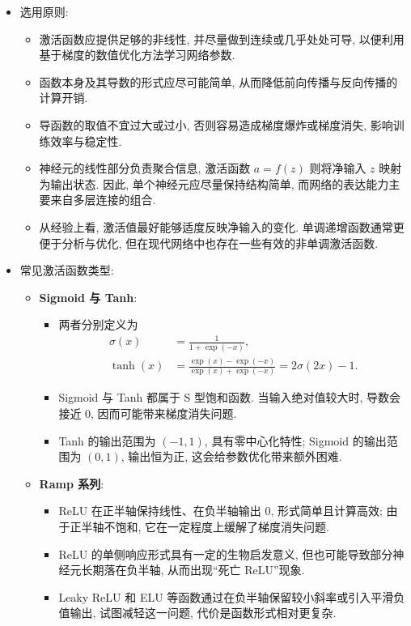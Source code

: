 \documentclass{../nndlcourse}
\begin{document}
\begin{itemize}
    \item 选用原则: 
    \begin{itemize}
        \item 激活函数应提供足够的非线性, 并尽量做到连续或几乎处处可导, 以便利用基于梯度的数值优化方法学习网络参数. 
        \item 函数本身及其导数的形式应尽可能简单, 从而降低前向传播与反向传播的计算开销. 
        \item 导函数的取值不宜过大或过小, 否则容易造成梯度爆炸或梯度消失, 影响训练效率与稳定性. 
        \item 神经元的线性部分负责聚合信息, 激活函数 $a = f(z)$ 则将净输入 $z$ 映射为输出状态. 因此, 单个神经元应尽量保持结构简单, 而网络的表达能力主要来自多层连接的组合. 
        \item 从经验上看, 激活值最好能够适度反映净输入的变化. 单调递增函数通常更便于分析与优化, 但在现代网络中也存在一些有效的非单调激活函数. 
    \end{itemize}
    \item 常见激活函数类型:
    \begin{itemize}
        \item \textbf{Sigmoid 与 Tanh}: 
        \begin{itemize}
            \item 两者分别定义为
            \begin{align*}
                \sigma(x) &= \frac{1}{1 + \exp(-x)}, \\
                \tanh(x) &= \frac{\exp(x) - \exp(-x)}{\exp(x) + \exp(-x)} = 2\sigma(2x) - 1.
            \end{align*}
            \item Sigmoid 与 Tanh 都属于 S 型饱和函数. 当输入绝对值较大时, 导数会接近 0, 因而可能带来梯度消失问题. 
            \item Tanh 的输出范围为 $(-1, 1)$, 具有零中心化特性; Sigmoid 的输出范围为 $(0, 1)$, 输出恒为正, 这会给参数优化带来额外困难. 
        \end{itemize}
        \item \textbf{Ramp 系列}: 
        \begin{itemize}
            \item ReLU 在正半轴保持线性、在负半轴输出 0, 形式简单且计算高效; 由于正半轴不饱和, 它在一定程度上缓解了梯度消失问题. 
            \item ReLU 的单侧响应形式具有一定的生物启发意义, 但也可能导致部分神经元长期落在负半轴, 从而出现“死亡 ReLU”现象. 
            \item Leaky ReLU 和 ELU 等函数通过在负半轴保留较小斜率或引入平滑负值输出, 试图减轻这一问题, 代价是函数形式相对更复杂. 

\end{itemize}
\end{itemize}
\end{itemize}
\end{document}

